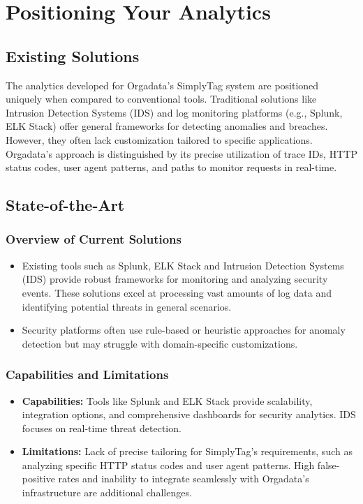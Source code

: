 %
%

\chapter{Positioning Your Analytics}

\section{Existing Solutions}

The analytics developed for Orgadata’s SimplyTag system are positioned uniquely when compared to conventional tools. Traditional solutions like Intrusion Detection Systems (IDS) \cite{IEEE:2020} and log monitoring platforms (e.g., Splunk, ELK Stack) \cite{IEEE:2022} offer general frameworks for detecting anomalies and breaches. However, they often lack customization tailored to specific applications. Orgadata’s approach is distinguished by its precise utilization of trace IDs, HTTP status codes, user agent patterns, and paths to monitor requests in real-time.

\section{State-of-the-Art}

\subsection{Overview of Current Solutions}
\begin{itemize}
	\item Existing tools such as Splunk, ELK Stack and Intrusion Detection Systems (IDS) provide robust frameworks for monitoring and analyzing security events. These solutions excel at processing vast amounts of log data and identifying potential threats in general scenarios.
	\item Security platforms often use rule-based or heuristic approaches for anomaly detection but may struggle with domain-specific customizations.
\end{itemize}

\subsection{Capabilities and Limitations}
\begin{itemize}
	\item \textbf{Capabilities:} Tools like Splunk and ELK Stack provide scalability, integration options, and comprehensive dashboards for security analytics. IDS focuses on real-time threat detection.
	\item \textbf{Limitations:}  Lack of precise tailoring for SimplyTag’s requirements, such as analyzing specific HTTP status codes and user agent patterns. High false-positive rates and inability to integrate seamlessly with Orgadata’s infrastructure are additional challenges.
\end{itemize}

